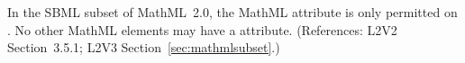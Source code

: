 In the SBML subset of MathML~2.0, the MathML attribute
 is only permitted on .  No other
MathML elements may have a  attribute.  (References:
L2V2 Section~3.5.1; L2V3 Section~\ref{sec:mathmlsubset}.)
